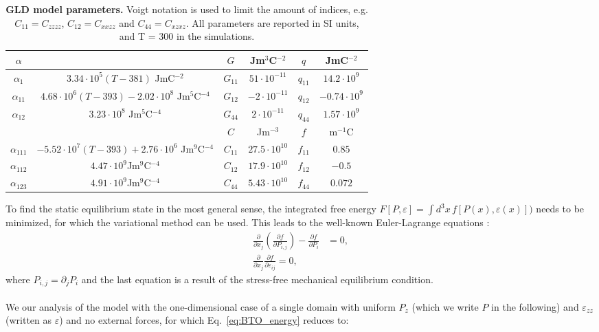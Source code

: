\begin{table}
\begin{tabular}{|c|c|c|c|c|c|}
	\hline
	 $\alpha$ & & $G$ & Jm$^3$C$^{-2}$& $q$ & JmC$^{-2}$\\
	 \hline
	 $\alpha_1$ & $3.34\cdot 10^5 (T - 381)$  JmC$^{-2}$& $G_{11}$ & $51 \cdot 10^{-11}$ & $q_{11}$ & $14.2 \cdot 10^{9}$ \\
	 $\alpha_{11}$ & $4.68 \cdot 10^6 (T-393) - 2.02 \cdot 10^8$ Jm$^5$C$^{-4}$& $G_{12}$ & $-2 \cdot 10^{-11}$ & $q_{12}$ & $-0.74 \cdot 10^{9}$ \\
	 $\alpha_{12}$ & $3.23 \cdot 10^8$ Jm$^5$C$^{-4}$ & $G_{44}$ & $2 \cdot 10^{-11}$  & $q_{44}$ & $1.57 \cdot 10^{9}$ \\
	 \cline{3-6}
	 & & $C$ &Jm$^{-3}$ & $f$ & m$^{-1}$C\\
	 \cline{3-6}
	 $\alpha_{111}$ & $-5.52 \cdot 10^7 (T - 393) + 2.76 \cdot 10^6 $ Jm$^9$C$^{-4}$ & $C_{11}$ & $27.5 \cdot 10^{10}$ & $f_{11}$ & $0.85$ \\
	 $\alpha_{112}$ &  $4.47 \cdot 10^9 $Jm$^9$C$^{-4}$  & $C_{12}$ & $17.9 \cdot 10^{10}$ & $f_{12}$ & $-0.5$  \\
	 $\alpha_{123}$ & $4.91 \cdot 10^9$Jm$^9$C$^{-4}$  &$C_{44}$ & $5.43 \cdot 10^{10}$ & $f_{44}$ & $ 0.072$ \\
	 \hline
\end{tabular}
\caption{{\bf GLD model parameters.} Voigt notation \cite{Voigt} is used to limit the amount of indices, e.g. $C_{11} = C_{zzzz}$, $C_{12} = C_{xxzz}$ and $C_{44}= C_{xzxz}$.  All parameters are reported in SI units, and T = 300 in the simulations.\label{tab:BTO_param}}
\end{table}
To find the static equilibrium state in the most general sense, the integrated free energy $F[P,\varepsilon] = \int d^3x \,f[P(x), \varepsilon(x)])$ needs to be minimized, for which the variational method can be used.
This leads to the well-known Euler-Lagrange equations \cite{Cao1991, Marton2010}:
\begin{align}
	\label{eq:BTO_euler}
	\frac{\partial}{\partial x_j}\left( \frac{\partial f}{\partial P_{i,j}}\right) - \frac{\partial f}{\partial P_i} &= 0, \\
	\frac{\partial}{\partial x_j}\frac{\partial f}{\partial \varepsilon_{ij}} = 0,
\end{align}
where $P_{i,j} = \partial_j P_i$ and the last equation is a result of the stress-free mechanical equilibrium condition.
\\\\
We our analysis of the model with the one-dimensional case of a single domain with uniform $P_z$ (which we write $P$ in the following) and $\varepsilon_{zz}$ (written as $\varepsilon$) and no external forces, for which Eq.~\ref{eq:BTO_energy} reduces to:
